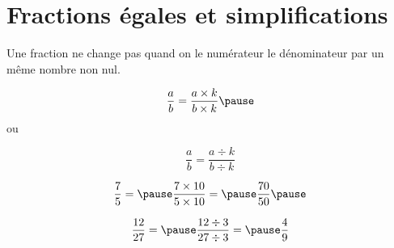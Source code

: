 \documentclass[xcolor={dvipsnames}]{beamer}
\begin{document}
	
	\section{Fractions égales et simplifications}
	
	
	\begin{frame}
		\begin{myprop}
			Une fraction ne change pas quand on  le numérateur  le dénominateur par un même nombre non nul.\pause
			
			
			\begin{equation*}
				\dfrac{a}{b} = \dfrac{a \times k}{b \times k} \pause
			\end{equation*}
			ou 
			
			\begin{equation*}
				\dfrac{a}{b} = \dfrac{a \div k}{b \div k} 
			\end{equation*}
			
		\end{myprop}
		
		
		\begin{myexs}
			
			
			\begin{equation*}
				\dfrac{\num{7}}{\num{5}} = \pause \dfrac{7 \times 10 }{5 \times 10 } = \pause \dfrac{\num{70}}{\num{50}} \pause
			\end{equation*}
			
			
			\begin{equation*}
				\dfrac{\num{12}}{\num{27}} = \pause \dfrac{\num{12} \div 3 }{\num{27} \div 3 } = \pause \dfrac{\num{4}}{\num{9}} 
			\end{equation*}
		\end{myexs}
	\end{frame}
	
\end{document}
